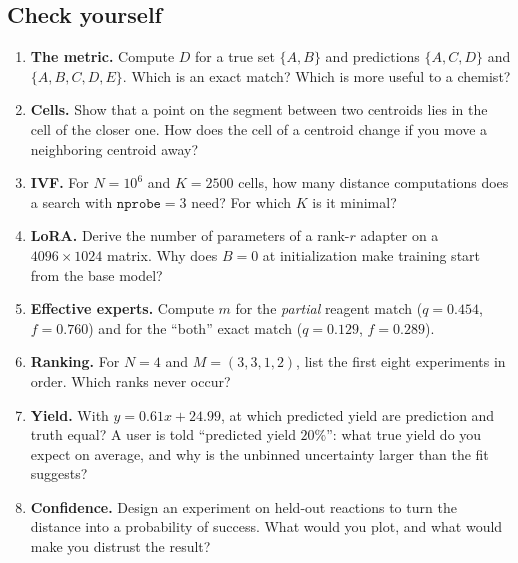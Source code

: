 \documentclass[11pt]{article}
\begin{document}
\subsection*{Check yourself}
\begin{enumerate}
  \item \textbf{The metric.} Compute $D$ for a true set $\{A,B\}$ and predictions $\{A,C,D\}$ and $\{A,B,C,D,E\}$. Which is an exact match? Which is more useful to a chemist?
  \item \textbf{Cells.} Show that a point on the segment between two centroids lies in the cell of the closer one. How does the cell of a centroid change if you move a neighboring centroid away?
  \item \textbf{IVF.} For $N=10^6$ and $K=2500$ cells, how many distance computations does a search with $\texttt{nprobe}=3$ need? For which $K$ is it minimal?
  \item \textbf{LoRA.} Derive the number of parameters of a rank-$r$ adapter on a $4096\times1024$ matrix. Why does $B=0$ at initialization make training start from the base model?
  \item \textbf{Effective experts.} Compute $m$ for the \emph{partial} reagent match ($q=0.454$, $f=0.760$) and for the ``both'' exact match ($q=0.129$, $f=0.289$).
  \item \textbf{Ranking.} For $N=4$ and $M=(3,3,1,2)$, list the first eight experiments in order. Which ranks never occur?
  \item \textbf{Yield.} With $y=0.61x+24.99$, at which predicted yield are prediction and truth equal? A user is told ``predicted yield $20\%$'': what true yield do you expect on average, and why is the unbinned uncertainty larger than the fit suggests?
  \item \textbf{Confidence.} Design an experiment on held-out reactions to turn the distance into a probability of success. What would you plot, and what would make you distrust the result?
\end{enumerate}
\end{document}
